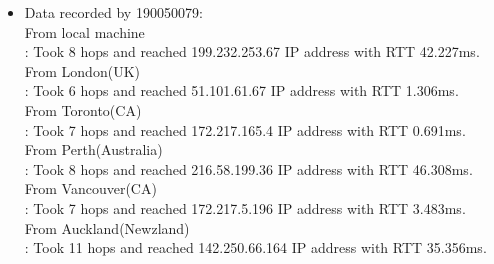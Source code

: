 \documentclass[12pt]{article}
\theoremstyle{remark}
\begin{document}
\begin{itemize}
\item Data recorded by 190050079:\\
From local machine  \\
: Took 8 hops and reached 199.232.253.67 IP address with RTT 42.227ms.\\
From London(UK)   \\
: Took 6 hops and reached 51.101.61.67  IP address with RTT 1.306ms.\\
From Toronto(CA)   \\
: Took 7 hops and reached 172.217.165.4 IP address with RTT 0.691ms.\\
From Perth(Australia)  \\
: Took 8 hops and reached 216.58.199.36 IP address with RTT 46.308ms.\\
From Vancouver(CA)       \\
: Took 7 hops and reached  172.217.5.196 IP address with RTT 3.483ms.\\
From Auckland(Newzland)   \\
: Took 11 hops and reached 142.250.66.164 IP address with RTT 35.356ms.\\ 
\end{itemize}
\end{document}
